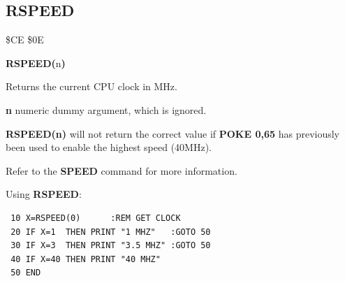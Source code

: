 \subsection{RSPEED}
\begin{description}[leftmargin=2cm,style=nextline]
\item [Token:] \$CE \$0E
\item [Format:] {\bf RSPEED(}n{\bf)}
\item [Usage:]  Returns the current CPU clock in MHz.

                {\bf n} numeric dummy argument, which is ignored.

\item [Remarks:] {\bf RSPEED(n)} will not return the correct value if {\bf POKE 0,65}
                 has previously been used to enable the highest speed (40MHz).

                 Refer to the {\bf SPEED} command for more information.

\item [Example:] Using {\bf RSPEED}:
\begin{tcolorbox}[colback=black,coltext=white]
\verbatimfont{\codefont}
\begin{verbatim}
 10 X=RSPEED(0)      :REM GET CLOCK
 20 IF X=1  THEN PRINT "1 MHZ"   :GOTO 50
 30 IF X=3  THEN PRINT "3.5 MHZ" :GOTO 50
 40 IF X=40 THEN PRINT "40 MHZ"
 50 END
\end{verbatim}
\end{tcolorbox}
\end{description}


\newpage
